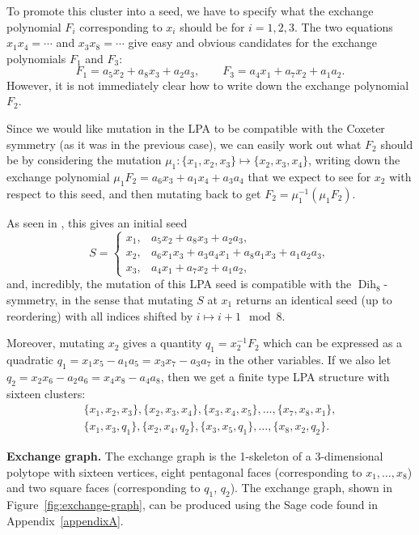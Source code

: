 \documentclass[10pt,a4paper]{amsart}
\numberwithin{equation}{section}
\theoremstyle{definition}
\DeclareMathOperator{\Dih}{Dih}
\begin{document}
To promote this cluster into a seed, we have to specify what the exchange polynomial $F_i$ corresponding to $x_i$ should be for $i=1,2,3$. The two equations $x_1x_4=\cdots$ and $x_3x_8=\cdots$ give easy and obvious candidates for the exchange polynomials $F_1$ and $F_3$:
\[ F_1 = a_5x_2 + a_8x_3 + a_2a_3, \qquad F_3 = a_4x_1 + a_7x_2 + a_1a_2. \]
However, it is not immediately clear how to write down the exchange polynomial $F_2$.

Since we would like mutation in the LPA to be compatible with the Coxeter symmetry (as it was in the previous case), we can easily work out what $F_2$ should be by considering the mutation $\mu_1\colon \{x_1,x_2,x_3\}\mapsto \{x_2,x_3,x_4\}$, writing down the exchange polynomial $\mu_1F_2=a_6x_3 + a_1x_4 + a_3a_4$ that we expect to see for $x_2$ with respect to this seed, and then mutating back to get $F_2 = \mu_1^{-1}(\mu_1F_2)$.

As seen in \cite{duc}, this gives an initial seed
\[ S = \begin{cases}
x_1, & a_5x_2 + a_8x_3 + a_2a_3, \\
x_2, & a_6x_1x_3 + a_3a_4x_1 + a_8a_1x_3 + a_1a_2a_3, \\
x_3, & a_4x_1 + a_7x_2 + a_1a_2,
\end{cases} \]
and, incredibly, the mutation of this LPA seed is compatible with the $\Dih_8$-symmetry, in the sense that mutating $S$ at $x_1$ returns an identical seed (up to reordering) with all indices shifted by $i\mapsto i+1\mod 8$.

Moreover, mutating $x_2$ gives a quantity $q_1 = x_2^{-1}F_2$ which can be expressed as a quadratic $q_1 = x_1x_5 - a_1a_5 = x_3x_7 - a_3a_7$ in the other variables. If we also let $q_2 = x_2x_6 - a_2a_6 = x_4x_8 - a_4a_8$, then we get a finite type LPA structure with sixteen clusters:
\begin{gather*} \{x_1,x_2,x_3\}, \{x_2,x_3,x_4\}, \{x_3,x_4,x_5\}, \dots, \{x_7,x_8,x_1\}, \\
 \{x_1,x_3,q_1\}, \{x_2,x_4,q_2\}, \{x_3,x_5,q_1\}, \dots, \{x_8,x_2,q_2\}. \end{gather*}

{\bf Exchange graph.}
The exchange graph is the 1-skeleton of a 3-dimensional polytope with sixteen vertices, eight pentagonal faces (corresponding to $x_1,\ldots,x_8$) and two square faces (corresponding to $q_1$, $q_2$). The exchange graph, shown in Figure~\ref{fig:exchange-graph}, can be produced using the Sage code found in Appendix~\ref{appendixA}.
\end{document}
